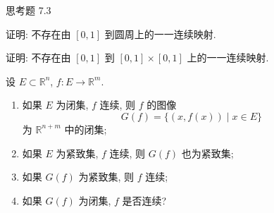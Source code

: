 \begin{exblock}{思考题 7.3}
  \item 证明: 不存在由 $[0, 1]$ 到圆周上的一一连续映射.

  \item 证明: 不存在由 $[0, 1]$ 到 $[0, 1] \times [0, 1]$ 上的一一连续映射.

  \item 设 $E \subset \mathbb{R}^{n}$, $f\colon E \to \mathbb{R}^{m}$.
  \begin{enumerate}
    \item 如果 $E$ 为闭集, $f$ 连续, 则 $f$ 的图像
    \[
      G(f) = \{(x, f(x)) \mid x \in E\}
    \]
    为 $\mathbb{R}^{n+m}$ 中的闭集;

    \item 如果 $E$ 为紧致集, $f$ 连续, 则 $G(f)$ 也为紧致集;

    \item 如果 $G(f)$ 为紧致集, 则 $f$ 连续;

    \item 如果 $G(f)$ 为闭集, $f$ 是否连续?
  \end{enumerate}
\end{exblock}